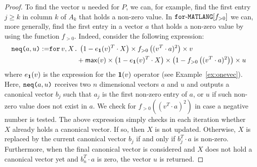 \begin{proof}
    To find the vector $u$ needed for $P$, we can, for example, find the first entry $j\geq k$ in column $k$ of $A_k$ that holds a non-zero value. In $\texttt{for}\text{-}\texttt{MATLANG}[f_{>0}]$  we can, more generally, find the first entry in a vector $a$ that holds a non-zero value by using the function $f_{>0}$. Indeed, consider the following expression:
    \begin{align*}\allowdisplaybreaks
       \nneq{a}{u} := &\texttt{for}\, v,X \texttt{.}\, \left( 1-e_{\ones}(v)^T\cdot X \right) \times f_{>0}\left( ( v^T\cdot a )^2 \right)\times v \\
        &\hspace{4em}+ \mathsf{max}(v)\times\left( 1-e_{\ones}(v)^T\cdot X \right)\times \left( 1 - f_{>0}\left( ( v^T\cdot a )^2 \right) \right) \times u \\
    \end{align*}
where $e_{\mathbf{1}}(v)$ is the expression for the $\mathbf{1}(v)$ operator (see Example~\ref{ex:onevec}).
Here, $\texttt{neq(}a,u\texttt{)}$ receives two $n$ dimensional vectors $a$ and $u$ and outputs a 
    canonical vector $b_j$ such that $a_j$ is the first non-zero entry of $a$, or $u$ if such non-zero value does not exist in $a$. We check for $f_{>0}((v^T\cdot a)^2)$ 
    in case a negative number is tested. The above expression simply checks in each iteration
    whether $X$ already holds a canonical vector. If so, then $X$ is not updated. Otherwise,
    $X$ is replaced by the current canonical vector $b_j$ if and only if $b_j^T\cdot a$ is non-zero. Furthermore, when the final canonical vector is considered and $X$ does not hold
    a canonical vector yet and $b_n^T\cdot a$ is zero, the vector $u$ is returned.


\end{proof}

